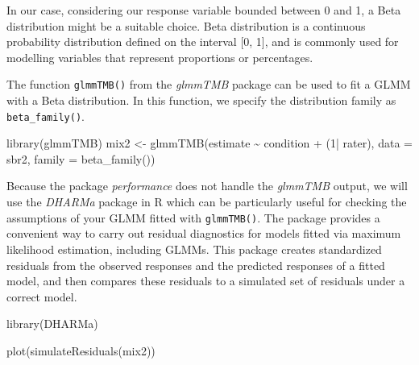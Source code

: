 \documentclass[
  letterpaper,
  DIV=11,
  numbers=noendperiod]{scrreprt}
\newenvironment{Shaded}{\begin{snugshade}}{\end{snugshade}}
\newcommand{\AttributeTok}[1]{\textcolor[rgb]{0.40,0.45,0.13}{#1}}
\newcommand{\DecValTok}[1]{\textcolor[rgb]{0.68,0.00,0.00}{#1}}
\newcommand{\FunctionTok}[1]{\textcolor[rgb]{0.28,0.35,0.67}{#1}}
\newcommand{\NormalTok}[1]{\textcolor[rgb]{0.00,0.23,0.31}{#1}}
\newcommand{\OtherTok}[1]{\textcolor[rgb]{0.00,0.23,0.31}{#1}}
\newcommand{\SpecialCharTok}[1]{\textcolor[rgb]{0.37,0.37,0.37}{#1}}
\begin{document}
In our case, considering our response variable bounded between 0 and 1,
a Beta distribution might be a suitable choice. Beta distribution is a
continuous probability distribution defined on the interval {[}0, 1{]},
and is commonly used for modelling variables that represent proportions
or percentages.

The function \texttt{glmmTMB()} from the \emph{glmmTMB} package can be
used to fit a GLMM with a Beta distribution. In this function, we
specify the distribution family as \texttt{beta\_family()}.

\begin{Shaded}
\begin{Highlighting}[]
\FunctionTok{library}\NormalTok{(glmmTMB)}
\NormalTok{mix2 }\OtherTok{\textless{}{-}}  \FunctionTok{glmmTMB}\NormalTok{(estimate }\SpecialCharTok{\textasciitilde{}}\NormalTok{ condition }\SpecialCharTok{+}\NormalTok{ (}\DecValTok{1}\SpecialCharTok{|}\NormalTok{ rater), }
                 \AttributeTok{data =}\NormalTok{ sbr2, }
                 \AttributeTok{family =} \FunctionTok{beta\_family}\NormalTok{())}
\end{Highlighting}
\end{Shaded}

Because the package \emph{performance} does not handle the
\emph{glmmTMB} output, we will use the \emph{DHARMa} package in R which
can be particularly useful for checking the assumptions of your GLMM
fitted with \texttt{glmmTMB()}. The package provides a convenient way to
carry out residual diagnostics for models fitted via maximum likelihood
estimation, including GLMMs. This package creates standardized residuals
from the observed responses and the predicted responses of a fitted
model, and then compares these residuals to a simulated set of residuals
under a correct model.

\begin{Shaded}
\begin{Highlighting}[]
\FunctionTok{library}\NormalTok{(DHARMa)}

\FunctionTok{plot}\NormalTok{(}\FunctionTok{simulateResiduals}\NormalTok{(mix2))}
\end{Highlighting}
\end{Shaded}
\end{document}
